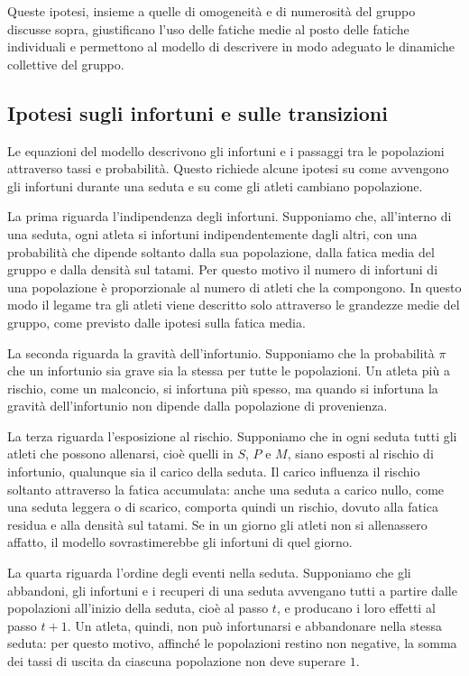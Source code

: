 Queste ipotesi, insieme a quelle di omogeneità e di numerosità del gruppo discusse sopra, giustificano l'uso delle fatiche medie al posto delle fatiche individuali e permettono al modello di descrivere in modo adeguato le dinamiche collettive del gruppo.

\subsection{Ipotesi sugli infortuni e sulle transizioni}

Le equazioni del modello descrivono gli infortuni e i passaggi tra le popolazioni attraverso tassi e probabilità. Questo richiede alcune ipotesi su come avvengono gli infortuni durante una seduta e su come gli atleti cambiano popolazione. \par

La prima riguarda l'indipendenza degli infortuni. Supponiamo che, all'interno di una seduta, ogni atleta si infortuni indipendentemente dagli altri, con una probabilità che dipende soltanto dalla sua popolazione, dalla fatica media del gruppo e dalla densità sul tatami. Per questo motivo il numero di infortuni di una popolazione è proporzionale al numero di atleti che la compongono. In questo modo il legame tra gli atleti viene descritto solo attraverso le grandezze medie del gruppo, come previsto dalle ipotesi sulla fatica media. \par

La seconda riguarda la gravità dell'infortunio. Supponiamo che la probabilità $\pi$ che un infortunio sia grave sia la stessa per tutte le popolazioni. Un atleta più a rischio, come un malconcio, si infortuna più spesso, ma quando si infortuna la gravità dell'infortunio non dipende dalla popolazione di provenienza. \par

La terza riguarda l'esposizione al rischio. Supponiamo che in ogni seduta tutti gli atleti che possono allenarsi, cioè quelli in $S$, $P$ e $M$, siano esposti al rischio di infortunio, qualunque sia il carico della seduta. Il carico influenza il rischio soltanto attraverso la fatica accumulata: anche una seduta a carico nullo, come una seduta leggera o di scarico, comporta quindi un rischio, dovuto alla fatica residua e alla densità sul tatami. Se in un giorno gli atleti non si allenassero affatto, il modello sovrastimerebbe gli infortuni di quel giorno. \par

La quarta riguarda l'ordine degli eventi nella seduta. Supponiamo che gli abbandoni, gli infortuni e i recuperi di una seduta avvengano tutti a partire dalle popolazioni all'inizio della seduta, cioè al passo $t$, e producano i loro effetti al passo $t+1$. Un atleta, quindi, non può infortunarsi e abbandonare nella stessa seduta: per questo motivo, affinché le popolazioni restino non negative, la somma dei tassi di uscita da ciascuna popolazione non deve superare $1$. \par

